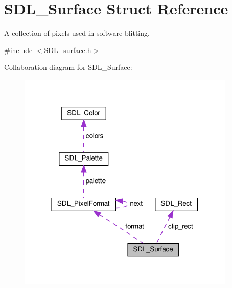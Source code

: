 \hypertarget{structSDL__Surface}{}\section{S\+D\+L\+\_\+\+Surface Struct Reference}
\label{structSDL__Surface}


A collection of pixels used in software blitting.  




{\ttfamily \#include $<$S\+D\+L\+\_\+surface.\+h$>$}



Collaboration diagram for S\+D\+L\+\_\+\+Surface\+:\nopagebreak
\begin{figure}[H]
\begin{center}
\leavevmode
\includegraphics[width=294pt]{structSDL__Surface__coll__graph}
\end{center}
\end{figure}
